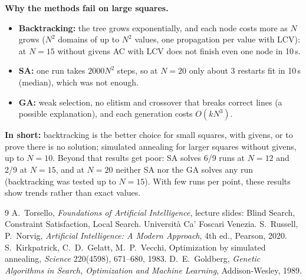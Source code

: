 \documentclass[11pt,a4paper]{article}
\begin{document}
\textbf{Why the methods fail on large squares.}
\begin{itemize}[nosep]
  \item \textbf{Backtracking:} the tree grows exponentially, and each node
        costs more as $N$ grows ($N^2$ domains of up to $N^2$ values, one
        propagation per value with LCV): at $N=15$ without givens AC with LCV
        does not finish even one node in 10\,s.
  \item \textbf{SA:} one run takes $2000N^2$ steps, so at $N=20$ only about
        3 restarts fit in 10\,s (median), which was not enough.
  \item \textbf{GA:} weak selection, no elitism and crossover that breaks
        correct lines (a possible explanation), and each generation costs
        $O(kN^3)$.
\end{itemize}

\textbf{In short:} backtracking is the better choice for small squares,
with givens, or to prove there is no solution; simulated annealing for
larger squares without givens, up to $N=10$. Beyond that results get
poor: SA solves 6/9 runs at $N=12$ and 2/9 at $N=15$, and at $N=20$
neither SA nor the GA solves any run (backtracking was tested up to
$N=15$). With few runs per point, these results
show trends rather than exact values.

\begin{thebibliography}{9}
 A.~Torsello, \emph{Foundations of Artificial
  Intelligence}, lecture slides: Blind Search, Constraint Satisfaction,
  Local Search. Università Ca' Foscari Venezia.
 S.~Russell, P.~Norvig, \emph{Artificial Intelligence: A
  Modern Approach}, 4th ed., Pearson, 2020.
 S.~Kirkpatrick, C.~D.~Gelatt, M.~P.~Vecchi,
  Optimization by simulated annealing, \emph{Science} 220(4598),
  671--680, 1983.
 D.~E.~Goldberg, \emph{Genetic Algorithms in Search,
  Optimization and Machine Learning}, Addison-Wesley, 1989.
\end{thebibliography}
\end{document}
